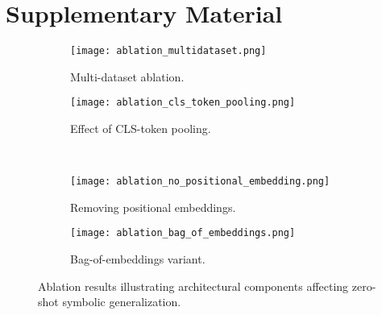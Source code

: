 \documentclass[11pt]{article}
\begin{document}
\section{Supplementary Material}
\begin{figure}[ht]
  \centering
  \begin{subfigure}[b]{0.45\textwidth}
    \texttt{[image: ablation\_multidataset.png]}
    \caption{Multi-dataset ablation.}
  \end{subfigure}
  \begin{subfigure}[b]{0.45\textwidth}
    \texttt{[image: ablation\_cls\_token\_pooling.png]}
    \caption{Effect of CLS-token pooling.}
  \end{subfigure}
  \\
  \begin{subfigure}[b]{0.45\textwidth}
    \texttt{[image: ablation\_no\_positional\_embedding.png]}
    \caption{Removing positional embeddings.}
  \end{subfigure}
  \begin{subfigure}[b]{0.45\textwidth}
    \texttt{[image: ablation\_bag\_of\_embeddings.png]}
    \caption{Bag-of-embeddings variant.}
  \end{subfigure}
  \caption{Ablation results illustrating architectural components affecting zero-shot symbolic generalization.}
\end{figure}


\end{document}
